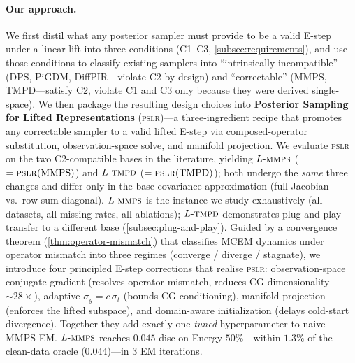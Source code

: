 \documentclass{article}
\theoremstyle{plain}
\theoremstyle{definition}
\theoremstyle{remark}
\newcommand{\pslr}{\textsc{pslr}}
\newcommand{\lmmps}{L\mbox{-}\textsc{mmps}}
\newcommand{\ltmpd}{L\mbox{-}\textsc{tmpd}}
\begin{document}
\paragraph{Our approach.}
We first distil what any posterior sampler must provide to be a valid E-step under a linear lift into three conditions (C1--C3, \cref{subsec:requirements}), and use those conditions to classify existing samplers into ``intrinsically incompatible'' (DPS, PiGDM, DiffPIR---violate C2 by design) and ``correctable'' (MMPS, TMPD---satisfy C2, violate C1 and C3 only because they were derived single-space). We then package the resulting design choices into \textbf{Posterior Sampling for Lifted Representations} (\pslr{})---a three-ingredient recipe that promotes any correctable sampler to a valid lifted E-step via composed-operator substitution, observation-space solve, and manifold projection. We evaluate \pslr{} on the two C2-compatible bases in the literature, yielding $\lmmps$ ($=\pslr{}(\mathrm{MMPS})$) and $\ltmpd$ ($=\pslr{}(\mathrm{TMPD})$); both undergo the \emph{same} three changes and differ only in the base covariance approximation (full Jacobian vs.\ row-sum diagonal). $\lmmps$ is the instance we study exhaustively (all datasets, all missing rates, all ablations); $\ltmpd$ demonstrates plug-and-play transfer to a different base (\cref{subsec:plug-and-play}). Guided by a convergence theorem (\cref{thm:operator-mismatch}) that classifies MCEM dynamics under operator mismatch into three regimes (converge / diverge / stagnate), we introduce four principled E-step corrections that realise \pslr{}: observation-space conjugate gradient (resolves operator mismatch, reduces CG dimensionality $\sim 28\times$), adaptive $\sigma_y = c\,\sigma_t$ (bounds CG conditioning), manifold projection (enforces the lifted subspace), and domain-aware initialization (delays cold-start divergence). Together they add exactly one \emph{tuned} hyperparameter to naive MMPS-EM. $\lmmps$ reaches $0.045$ disc on Energy $50\%$---within $1.3\%$ of the clean-data oracle ($0.044$)---in $3$ EM iterations.
\end{document}
